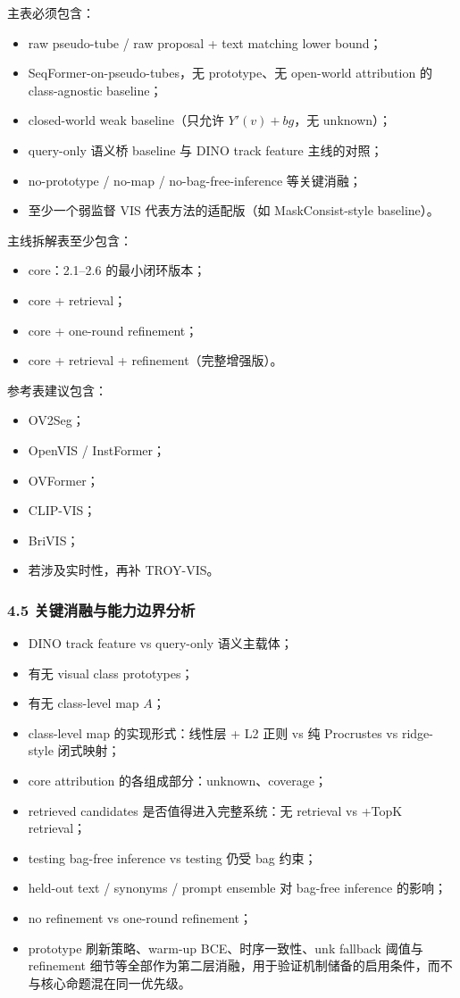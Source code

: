 \documentclass[UTF8]{ctexart}
\begin{document}
主表必须包含：
\begin{itemize}
\item raw pseudo-tube / raw proposal + text matching lower bound；
\item SeqFormer-on-pseudo-tubes，无 prototype、无 open-world attribution 的 class-agnostic baseline；
\item closed-world weak baseline（只允许 $Y'(v)+bg$，无 unknown）；
\item query-only 语义桥 baseline 与 DINO track feature 主线的对照；
\item no-prototype / no-map / no-bag-free-inference 等关键消融；
\item 至少一个弱监督 VIS 代表方法的适配版（如 MaskConsist-style baseline）。
\end{itemize}

主线拆解表至少包含：
\begin{itemize}
\item core：2.1--2.6 的最小闭环版本；
\item core + retrieval；
\item core + one-round refinement；
\item core + retrieval + refinement（完整增强版）。
\end{itemize}

参考表建议包含：
\begin{itemize}
\item OV2Seg；
\item OpenVIS / InstFormer；
\item OVFormer；
\item CLIP-VIS；
\item BriVIS；
\item 若涉及实时性，再补 TROY-VIS。
\end{itemize}

\subsubsection*{4.5 关键消融与能力边界分析}
\begin{itemize}
\item DINO track feature vs query-only 语义主载体；
\item 有无 visual class prototypes；
\item 有无 class-level map $A$；
\item class-level map 的实现形式：线性层 + L2 正则 vs 纯 Procrustes vs ridge-style 闭式映射；
\item core attribution 的各组成部分：unknown、coverage；
\item retrieved candidates 是否值得进入完整系统：无 retrieval vs +TopK retrieval；
\item testing bag-free inference vs testing 仍受 bag 约束；
\item held-out text / synonyms / prompt ensemble 对 bag-free inference 的影响；
\item no refinement vs one-round refinement；
\item prototype 刷新策略、warm-up BCE、时序一致性、unk fallback 阈值与 refinement 细节等全部作为第二层消融，用于验证机制储备的启用条件，而不与核心命题混在同一优先级。
\end{itemize}
\end{document}
